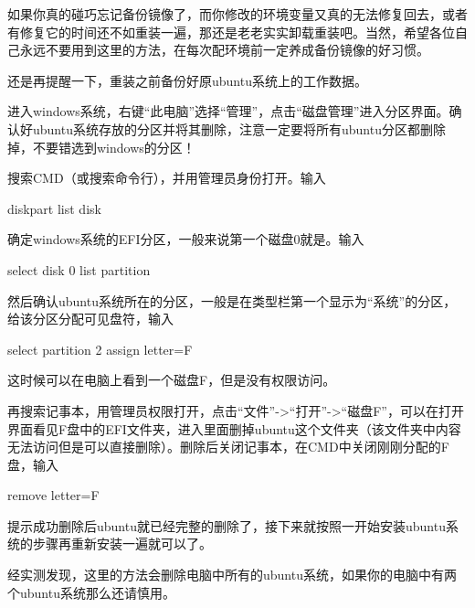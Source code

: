 如果你真的碰巧忘记备份镜像了，而你修改的环境变量又真的无法修复回去，或者有修复它的时间还不如重装一遍，那还是老老实实卸载重装吧。当然，希望各位自己永远不要用到这里的方法，在每次配环境前一定养成备份镜像的好习惯。

还是再提醒一下，重装之前备份好原ubuntu系统上的工作数据。

进入windows系统，右键“此电脑”选择“管理”，点击“磁盘管理”进入分区界面。确认好ubuntu系统存放的分区并将其删除，注意一定要将所有ubuntu分区都删除掉，不要错选到windows的分区！

搜索CMD（或搜索命令行），并用管理员身份打开。输入
\begin{tcode}
	diskpart
	list disk
\end{tcode}

确定windows系统的EFI分区，一般来说第一个磁盘0就是。输入
\begin{tcode}
	select disk 0
	list partition
\end{tcode}

然后确认ubuntu系统所在的分区，一般是在类型栏第一个显示为“系统”的分区，给该分区分配可见盘符，输入
\begin{tcode}
	select partition 2
	assign letter=F
\end{tcode}

这时候可以在电脑上看到一个磁盘F，但是没有权限访问。

再搜索记事本，用管理员权限打开，点击“文件”->“打开”->“磁盘F”，可以在打开界面看见F盘中的EFI文件夹，进入里面删掉ubuntu这个文件夹（该文件夹中内容无法访问但是可以直接删除）。删除后关闭记事本，在CMD中关闭刚刚分配的F盘，输入
\begin{tcode}
	remove letter=F
\end{tcode}

提示成功删除后ubuntu就已经完整的删除了，接下来就按照一开始安装ubuntu系统的步骤再重新安装一遍就可以了。

经实测发现，这里的方法会删除电脑中所有的ubuntu系统，如果你的电脑中有两个ubuntu系统那么还请慎用。

